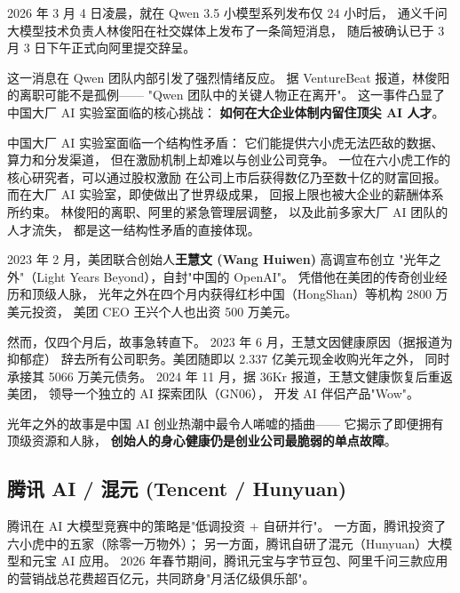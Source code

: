 2026 年 3 月 4 日凌晨，就在 Qwen 3.5 小模型系列发布仅 24 小时后，
通义千问大模型技术负责人林俊阳在社交媒体上发布了一条简短消息，
随后被确认已于 3 月 3 日下午正式向阿里提交辞呈。

这一消息在 Qwen 团队内部引发了强烈情绪反应。
据 VentureBeat 报道，林俊阳的离职可能不是孤例——
"Qwen 团队中的关键人物正在离开"。
这一事件凸显了中国大厂 AI 实验室面临的核心挑战：
\textbf{如何在大企业体制内留住顶尖 AI 人才}。

\begin{whybox}[大厂 AI 实验室的人才困境]
中国大厂 AI 实验室面临一个结构性矛盾：
它们能提供六小虎无法匹敌的数据、算力和分发渠道，
但在激励机制上却难以与创业公司竞争。
一位在六小虎工作的核心研究者，可以通过股权激励
在公司上市后获得数亿乃至数十亿的财富回报。
而在大厂 AI 实验室，即使做出了世界级成果，
回报上限也被大企业的薪酬体系所约束。
林俊阳的离职、阿里的紧急管理层调整，
以及此前多家大厂 AI 团队的人才流失，
都是这一结构性矛盾的直接体现。
\end{whybox}


\begin{warnbox}
2023 年 2 月，美团联合创始人\textbf{王慧文 (Wang Huiwen)} 高调宣布创立
"光年之外"（Light Years Beyond），自封"中国的 OpenAI"。
凭借他在美团的传奇创业经历和顶级人脉，
光年之外在四个月内获得红杉中国（HongShan）等机构 2800 万美元投资，
美团 CEO 王兴个人也出资 500 万美元。

然而，仅四个月后，故事急转直下。
2023 年 6 月，王慧文因健康原因（据报道为抑郁症）
辞去所有公司职务。美团随即以 2.337 亿美元现金收购光年之外，
同时承接其 5066 万美元债务。
2024 年 11 月，据 36Kr 报道，王慧文健康恢复后重返美团，
领导一个独立的 AI 探索团队（GN06），
开发 AI 伴侣产品"Wow"。

光年之外的故事是中国 AI 创业热潮中最令人唏嘘的插曲——
它揭示了即便拥有顶级资源和人脉，
\textbf{创始人的身心健康仍是创业公司最脆弱的单点故障}。
\end{warnbox}


\subsection{腾讯 AI / 混元 (Tencent / Hunyuan)}

腾讯在 AI 大模型竞赛中的策略是"低调投资 + 自研并行"。
一方面，腾讯投资了六小虎中的五家（除零一万物外）；
另一方面，腾讯自研了混元（Hunyuan）大模型和元宝 AI 应用。
2026 年春节期间，腾讯元宝与字节豆包、阿里千问三款应用
的营销战总花费超百亿元，共同跻身"月活亿级俱乐部"。

